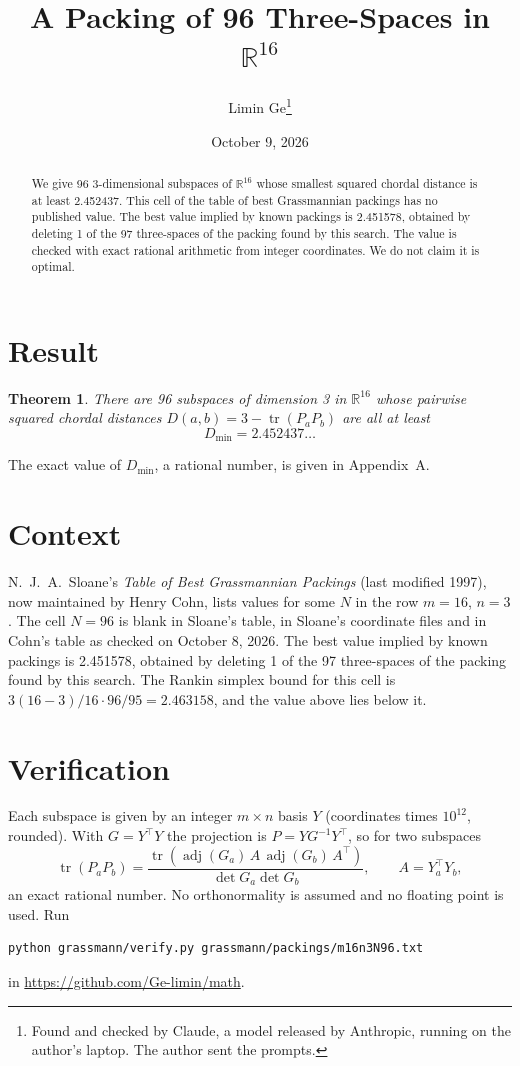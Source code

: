 \documentclass[11pt,a4paper]{article}
\title{A Packing of 96 Three-Spaces in $\mathbb{R}^{16}$}
\author{Limin Ge\thanks{Found and checked by Claude, a model released by Anthropic, running on the author's laptop. The author sent the prompts.}}
\date{October 9, 2026}
\newtheorem*{theorem}{Theorem}
\begin{document}
\maketitle
\begin{abstract}
We give 96 3-dimensional subspaces of $\mathbb{R}^{16}$ whose smallest squared chordal distance is at least 2.452437. This cell of the table of best Grassmannian packings has no published value. The best value implied by known packings is 2.451578, obtained by deleting 1 of the 97 three-spaces of the packing found by this search. The value is checked with exact rational arithmetic from integer coordinates. We do not claim it is optimal.
\end{abstract}

\section{Result}
\begin{theorem}
There are 96 subspaces of dimension 3 in $\mathbb{R}^{16}$ whose pairwise squared chordal distances $D(a,b) = 3 - \operatorname{tr}(P_aP_b)$ are all at least
\[ D_{\min} = 2.452437\ldots \]
\end{theorem}
The exact value of $D_{\min}$, a rational number, is given in Appendix~A.


\section{Context}
N.~J.~A.~Sloane's \emph{Table of Best Grassmannian Packings} (last modified 1997), now maintained by Henry Cohn, lists values for some $N$ in the row $m=16$, $n=3$. The cell $N=96$ is blank in Sloane's table, in Sloane's coordinate files and in Cohn's table as checked on October 8, 2026. The best value implied by known packings is 2.451578, obtained by deleting 1 of the 97 three-spaces of the packing found by this search. The Rankin simplex bound for this cell is $3(16-3)/16\cdot 96/95 = 2.463158$, and the value above lies below it.


\section{Verification}
Each subspace is given by an integer $m\times n$ basis $Y$ (coordinates times $10^{12}$, rounded). With $G=Y^\top Y$ the projection is $P=YG^{-1}Y^\top$, so for two subspaces
\[ \operatorname{tr}(P_aP_b)=\frac{\operatorname{tr}(\operatorname{adj}(G_a)\,A\,\operatorname{adj}(G_b)\,A^\top)}{\det G_a\det G_b},\qquad A=Y_a^\top Y_b, \]
an exact rational number. No orthonormality is assumed and no floating point is used. Run
\begin{verbatim}
python grassmann/verify.py grassmann/packings/m16n3N96.txt
\end{verbatim}
in \url{https://github.com/Ge-limin/math}.
\end{document}
